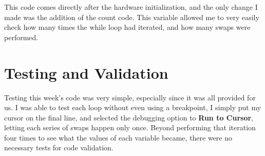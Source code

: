 \documentclass[a4paper, 12pt]{article}
\begin{document}
This code comes directly after the hardware initialization, and the only change I made was the addition of the count code. This variable allowed me to very easily check how many times the while loop had iterated, and how many swaps were performed.

\section{Testing and Validation}
Testing this week's code was very simple, especially since it was all provided for us. I was able to test each loop without even using a breakpoint, I simply put my cursor on the final line, and selected the debugging option to \textbf{Run to Cursor}, letting each series of swaps happen only once. Beyond performing that iteration four times to see what the values of each variable became, there were no necessary tests for code validation.
\end{document}
